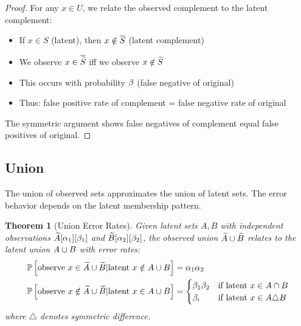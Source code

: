 \documentclass[11pt,final,hidelinks]{article}
\newtheorem{theorem}{Theorem}[section]
\begin{document}
\begin{proof}
For any $x \in U$, we relate the observed complement to the latent complement:
\begin{itemize}
    \item If $x \in S$ (latent), then $x \notin \overline{S}$ (latent complement)
    \item We observe $x \in \overline{\widetilde{S}}$ iff we observe $x \notin \widetilde{S}$
    \item This occurs with probability $\beta$ (false negative of original)
    \item Thus: false positive rate of complement = false negative rate of original
\end{itemize}
The symmetric argument shows false negatives of complement equal false positives of original.
\end{proof}

\subsection{Union}

The union of observed sets approximates the union of latent sets. The error behavior depends on the latent membership pattern.

\begin{theorem}[Union Error Rates]
Given latent sets $A, B$ with independent observations $\widetilde{A}[\alpha_1][\beta_1]$ and $\widetilde{B}[\alpha_2][\beta_2]$, the observed union $\widetilde{A} \cup \widetilde{B}$ relates to the latent union $A \cup B$ with error rates:
\begin{align}
\mathbb{P}\left[\text{observe } x \in \widetilde{A} \cup \widetilde{B} | \text{latent } x \notin A \cup B\right] &= \alpha_1 \alpha_2 \\
\mathbb{P}\left[\text{observe } x \notin \widetilde{A} \cup \widetilde{B} | \text{latent } x \in A \cup B\right] &= \begin{cases}
\beta_1 \beta_2 & \text{if latent } x \in A \cap B \\
\beta_i & \text{if latent } x \in A \triangle B
\end{cases}
\end{align}
where $\triangle$ denotes symmetric difference.
\end{theorem}
\end{document}
